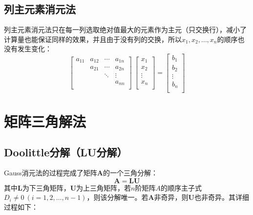 \subsection{列主元素消元法}
列主元素消元法只在每一列选取绝对值最大的元素作为主元（只交换行），减小了计算量也能保证同样的效果，并且由于没有列的交换，所以$x_1,x_2,\dots,x_n$的顺序也没有发生变化：
\begin{equation*}
    \begin{bmatrix}
        a_{11} & a_{12} & \cdots & a_{1n} \\
        \      & a_{21} & \cdots & a_{2n} \\
        \      & \      & \ddots & \vdots \\
        \      & \      & \      & a_{nn} \\
    \end{bmatrix}\ 
    \begin{bmatrix}
        x_1 \\ x_2 \\ \vdots \\ x_n \\
    \end{bmatrix} = 
    \begin{bmatrix}
        b_1 \\ b_2 \\ \vdots \\ b_n \\
    \end{bmatrix}
\end{equation*}



\newpage
\section{矩阵三角解法}

\subsection{Doolittle分解（LU分解）}
Gauss消元法的过程完成了矩阵$\boldsymbol{A}$的一个三角分解：
\begin{equation}
    \boldsymbol{A} = \boldsymbol{LU}
\end{equation}
其中$\boldsymbol{L}$为下三角矩阵，$\boldsymbol{U}$为上三角矩阵，若$n$阶矩阵$A$的顺序主子式$D_i \neq 0\ (i=1,2,\dots,n-1)$，则该分解唯一。若$\boldsymbol{A}$非奇异，则$\boldsymbol{U}$也非奇异。其详细过程如下：

